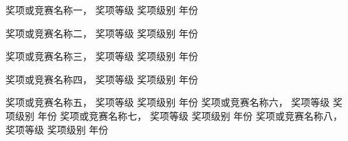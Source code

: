 \begin{cvhonors}
  \cvhonor
    {奖项或竞赛名称一，} %
    {奖项等级} %
    {奖项级别} %
    {年份} %

  \cvhonor
    {奖项或竞赛名称二，} %
    {奖项等级} %
    {奖项级别} %
    {年份} %

  \cvhonor
    {奖项或竞赛名称三，} %
    {奖项等级} %
    {奖项级别} %
    {年份} %

  \cvhonor
    {奖项或竞赛名称四，} %
    {奖项等级} %
    {奖项级别} %
    {年份} %

  \cvhonor
    {奖项或竞赛名称五，} %
    {奖项等级} %
    {奖项级别} %
    {年份} %
  \cvhonor
    {奖项或竞赛名称六，} %
    {奖项等级} %
    {奖项级别} %
    {年份} %
  \cvhonor
    {奖项或竞赛名称七，} %
    {奖项等级} %
    {奖项级别} %
    {年份} %
  \cvhonor
    {奖项或竞赛名称八，} %
    {奖项等级} %
    {奖项级别} %
    {年份} %
  
\end{cvhonors}
